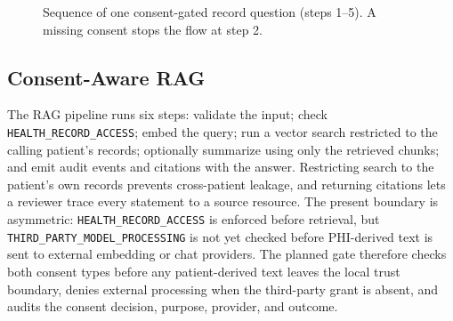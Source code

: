 \documentclass[conference]{IEEEtran}
\begin{document}
\begin{figure}[!t]
\centering
{}
\caption{Sequence of one consent-gated record question (steps 1--5). A missing consent stops the flow at step 2.}
\label{fig:seq}
\end{figure}

\subsection{Consent-Aware RAG}
The RAG pipeline runs six steps: validate the input; check \texttt{HEALTH\_RECORD\_ACCESS}; embed the query; run a vector search restricted to the calling patient's records; optionally summarize using only the retrieved chunks; and emit audit events and citations with the answer.
Restricting search to the patient's own records prevents cross-patient leakage, and returning citations lets a reviewer trace every statement to a source resource.
The present boundary is asymmetric: \texttt{HEALTH\_RECORD\_ACCESS} is enforced before retrieval, but \texttt{THIRD\_PARTY\_MODEL\_PROCESSING} is not yet checked before PHI-derived text is sent to external embedding or chat providers.
The planned gate therefore checks both consent types before any patient-derived text leaves the local trust boundary, denies external processing when the third-party grant is absent, and audits the consent decision, purpose, provider, and outcome.
\end{document}
